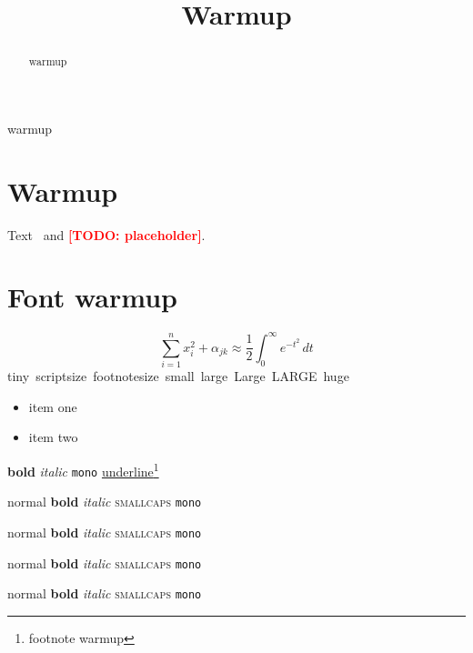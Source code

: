 \documentclass[conference]{IEEEtran}
\providecommand{\todo}[1]{\textcolor{red}{\textbf{[TODO: #1]}}}
\begin{document}
\title{Warmup}\author{}
\maketitle
\begin{abstract}warmup\end{abstract}
\begin{IEEEkeywords}warmup\end{IEEEkeywords}
\section{Warmup}
Text~\cite{warmup2020sample} and \todo{placeholder}.

\section{Font warmup}
\begin{equation}\label{eq:warm}
  \sum_{i=1}^{n} x_i^{2} + \alpha_{jk} \approx \frac{1}{2}\int_0^\infty e^{-t^2}\,dt
\end{equation}
{\tiny tiny}\ {\scriptsize scriptsize}\ {\footnotesize footnotesize}\ {\small small}\
{\large large}\ {\Large Large}\ {\LARGE LARGE}\ {\huge huge}
\begin{itemize}\item item one\item item two\end{itemize}
\textbf{bold} \textit{italic} \texttt{mono} \underline{underline}\footnote{footnote warmup}


{\tiny normal} {\tiny \textbf{bold}} {\tiny \textit{italic}} {\tiny \textsc{smallcaps}} {\tiny \texttt{mono}}

{\scriptsize normal} {\scriptsize \textbf{bold}} {\scriptsize \textit{italic}} {\scriptsize \textsc{smallcaps}} {\scriptsize \texttt{mono}}

{\footnotesize normal} {\footnotesize \textbf{bold}} {\footnotesize \textit{italic}} {\footnotesize \textsc{smallcaps}} {\footnotesize \texttt{mono}}

{\small normal} {\small \textbf{bold}} {\small \textit{italic}} {\small \textsc{smallcaps}} {\small \texttt{mono}}
\end{document}
